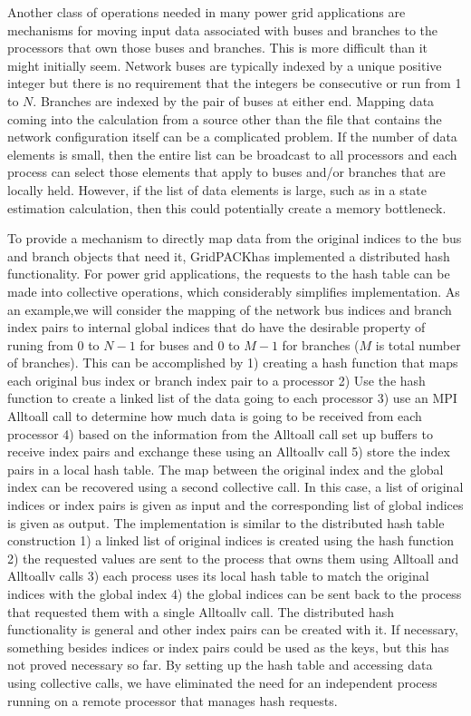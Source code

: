 \documentclass[preprint]{acm_proc_article-sp}
\begin{document}
Another class of operations needed in many power grid applications are
mechanisms for moving input data associated with buses and branches to the
processors that own those buses and branches. This is more difficult than it
might initially seem. Network buses are typically indexed by a unique positive
integer but there is no requirement that the integers be consecutive or run from
1 to $N$. Branches are indexed by the pair of buses at either end. Mapping data
coming into the calculation from a source other than the file that contains the
network configuration itself can be a complicated problem. If the number of data
elements is small, then the entire list can be broadcast to all processors and
each process can select those elements that apply to buses and/or branches that
are locally held. However, if the list of data elements is large, such as in a
state estimation calculation, then this could potentially create a memory
bottleneck.

To provide a mechanism to directly map data from the original indices to the bus
and branch objects that need it, GridPACK\texttrademark has implemented a
distributed hash
functionality. For power grid applications, the requests to the hash table can be
made into collective operations, which considerably simplifies implementation.
As an example,we will consider the mapping of the network bus
indices and branch index pairs to internal global indices that do have the
desirable property of runing from 0 to $N-1$ for buses and 0 to $M-1$ for
branches ($M$ is total number of branches). This can be accomplished by 1)
creating a hash function that maps each original bus index or branch index pair
to a processor 2) Use the hash function to create a linked list of the data
going to each processor 3) use an MPI Alltoall call to determine how much data
is going to be received from each processor 4) based on the information from the
Alltoall call set up buffers to receive index pairs and exchange these using an
Alltoallv call 5) store the index pairs in a local hash table. The map between
the original index and the global index can be recovered using a  second collective
call. In this case, a list of original indices or index pairs is given as input
and the corresponding list of global indices is given as output. The
implementation is similar to the distributed hash table construction 1) a linked
list of original indices is created using the hash function 2) the requested
values are sent to the process that owns them using Alltoall and Alltoallv calls
3) each process uses its local hash table to match the original indices with the
global index 4) the global indices can be sent back to the process that
requested them with a single Alltoallv call. The distributed hash functionality is
general and other index pairs can be created with it. If necessary, something
besides indices or index pairs could be used as the keys, but this has not
proved necessary so far. By setting up the hash table and accessing data using
collective calls, we have eliminated the need for an independent process running
on a remote processor that manages hash requests.
\end{document}
